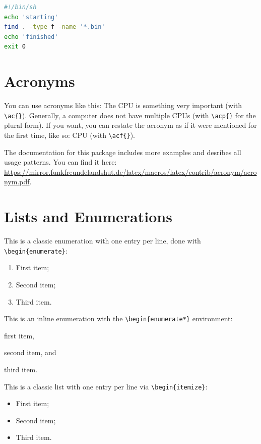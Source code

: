 \begin{lstlisting}[language=sh, caption={Code snippet in POSIX shell}, label=lst:sh]
#!/bin/sh
echo 'starting'
find . -type f -name '*.bin'
echo 'finished'
exit 0
\end{lstlisting}


\section{Acronyms}
You can use acronyms like this: The \ac{CPU} is something very important (with \verb|\ac{}|). 
Generally, a computer does not have multiple \acp{CPU} (with \verb|\acp{}| for the plural form).
If you want, you can restate the acronym as if it were mentioned for the first time, like so: \acf{CPU} (with \verb|\acf{}|).

The documentation for this package includes more examples and desribes all usage patterns.
You can find it here: \url{https://mirror.funkfreundelandshut.de/latex/macros/latex/contrib/acronym/acronym.pdf}.


\section{Lists and Enumerations}
This is a classic enumeration with one entry per line, done with \verb|\begin{enumerate}|:
\begin{enumerate}
    \item First item;
    \item Second item;
    \item Third item.
\end{enumerate}

This is an inline enumeration with the \verb|\begin{enumerate*}| environment:
\begin{enumerate*}
    \item first item,
    \item second item, and
    \item third item.
\end{enumerate*}

This is a classic list with one entry per line via \verb|\begin{itemize}|:
\begin{itemize}
    \item First item;
    \item Second item;
    \item Third item.
\end{itemize}

